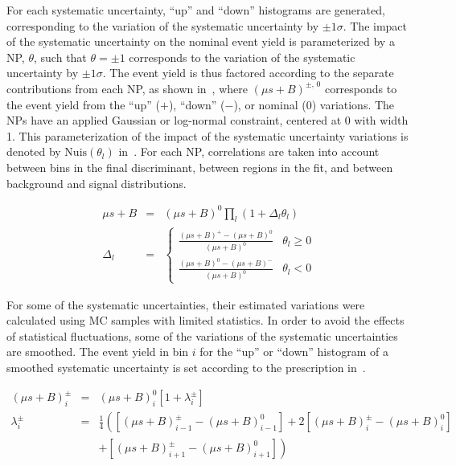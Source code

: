 For each systematic uncertainty, ``up'' and ``down'' histograms are generated, corresponding to the variation of the systematic uncertainty by $\pm 1\sigma$. The impact of the systematic uncertainty on the nominal event yield is parameterized by a NP, $\theta$, such that $\theta=\pm1$ corresponds to the variation of the systematic uncertainty by $\pm 1 \sigma$. The event yield is thus factored according to the separate contributions from each NP, as shown in~\Eqns{\ref{eq:syst_imp}}{\ref{eq:delta_np}}, where $(\mu s +B)^{\pm,\,0}$ corresponds to the event yield from the ``up'' ($+$), ``down'' ($-$), or nominal ($0$) variations. The NPs have an applied Gaussian or log-normal constraint, centered at 0 with width 1. This parameterization of the impact of the systematic uncertainty variations is denoted by $\text{Nuis}(\theta_l)$ in~\Eqn{\ref{eq:lh_func}}. For each NP, correlations are taken into account between bins in the final discriminant, between regions in the fit, and between background and signal distributions. 

\begin{eqnarray}
\mu s+B&=&(\mu s+B)^0\prod_l\left(1+\Delta_l\theta_l\right)\label{eq:syst_imp}\\
\Delta_l&=& \begin{cases}\frac{(\mu s+B)^+-(\mu s+B)^0}{(\mu s+B)^0} & \theta_l\geq 0 \\ \frac{(\mu s+B)^0-(\mu s+B)^-}{(\mu s+B)^0} & \theta_l<0  \end{cases} \label{eq:delta_np}
\end{eqnarray}


For some of the systematic uncertainties, their estimated variations were calculated using MC samples with limited statistics. In order to avoid the effects of statistical fluctuations, some of the variations of the systematic uncertainties are smoothed. The event yield in bin $i$ for the ``up'' or ``down'' histogram of a smoothed systematic uncertainty is set according to the prescription in~\Eqns{\ref{eq:smoothing:a}}{\ref{eq:smoothing:b}}.

\begin{eqnarray}
(\mu s+B)^{\pm}_i&=&(\mu s + B)^0_i\left[1+\lambda_i^{\pm}\right] \label{eq:smoothing:a}\\
\lambda_i^{\pm}&=&\frac{1}{4}\left( \left[(\mu s+B)^{\pm}_{i-1}-(\mu s+B)^0_{i-1}\right] +2\left[(\mu s+B)^{\pm}_{i} - (\mu s+B)^0_{i}\right]  \right.\nonumber \\
& & \left.+ \left[(\mu s+B)^{\pm}_{i+1}-(\mu s+B)^0_{i+1}\right]  \right) \label{eq:smoothing:b}
\end{eqnarray}


